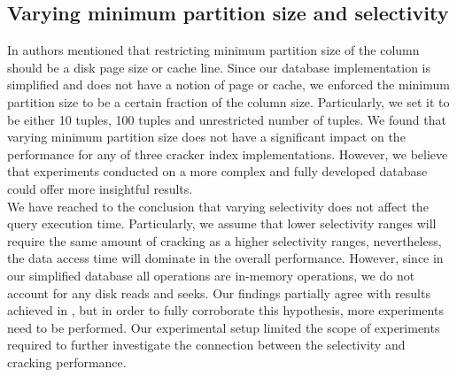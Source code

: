 \subsection{Varying minimum partition size and selectivity}
In \cite{idreos_2007} authors mentioned that restricting minimum partition size of the column  should be a disk page size or cache line. Since our database implementation is simplified and does not have a notion of page or cache, we enforced the minimum partition size to be a certain fraction of the column size. Particularly, we set it to be either 10 tuples, 100 tuples and unrestricted number of tuples. We found that varying minimum partition size does not have a significant impact on the performance for any of three cracker index implementations. However, we believe that experiments conducted on a more complex and fully developed database could offer more insightful results. \\
We have reached to the conclusion that varying selectivity does not affect the query execution time. Particularly, we assume that lower selectivity ranges will require the same amount of cracking as a higher selectivity ranges, nevertheless, the data access time will dominate in the overall performance. However, since in our simplified database all operations are in-memory operations, we do not account for any disk reads and seeks. Our findings partially agree with results achieved in \cite{schuhknecht_2014}, but in order to fully corroborate this hypothesis, more experiments need to be performed. Our experimental setup limited the scope of experiments required to further investigate the connection between the selectivity and cracking performance.
\label{sec:experiments}

